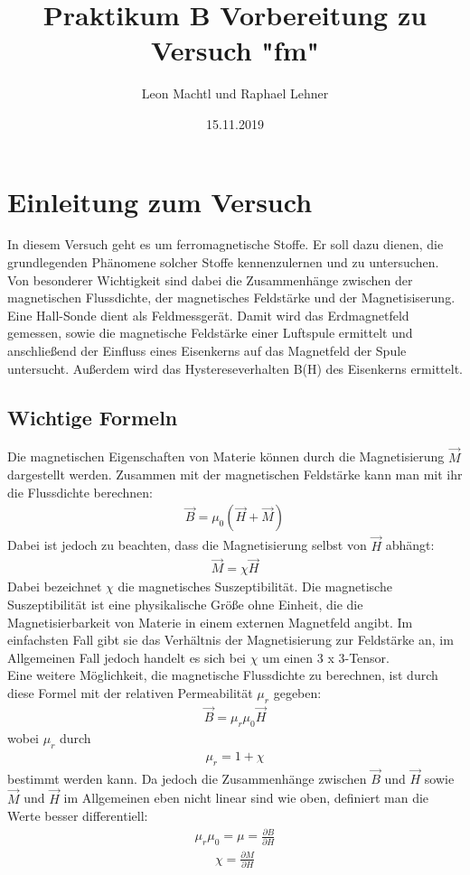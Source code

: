 \documentclass[a4paper,10pt]{scrartcl}
\title{Praktikum B Vorbereitung zu Versuch "fm"}
\author{Leon Machtl und Raphael Lehner}
\date{15.11.2019}
\begin{document}
	\maketitle
	\tableofcontents
	\newpage
	
	\section{Einleitung zum Versuch}
		In diesem Versuch geht es um ferromagnetische Stoffe. Er soll dazu dienen, die grundlegenden Phänomene solcher Stoffe kennenzulernen und zu untersuchen. Von besonderer Wichtigkeit sind dabei die Zusammenhänge zwischen der magnetischen Flussdichte, der magnetisches Feldstärke und der Magnetisiserung. Eine Hall-Sonde dient als Feldmessgerät. Damit wird das Erdmagnetfeld gemessen, sowie die magnetische Feldstärke einer Luftspule ermittelt und anschließend der Einfluss eines Eisenkerns auf das Magnetfeld der Spule untersucht. Außerdem wird das Hystereseverhalten B(H) des Eisenkerns ermittelt.
	
	\subsection{Wichtige Formeln}
		Die magnetischen Eigenschaften von Materie können durch die Magnetisierung \(\vec{M}\) dargestellt werden. Zusammen mit der magnetischen Feldstärke kann man mit ihr die Flussdichte berechnen:
		\begin{align}
		\vec{B}=\mu_{0} (\vec{H} + \vec{M})
		\end{align}
		Dabei ist jedoch zu beachten, dass die Magnetisierung selbst von \(\vec{H}\) abhängt:
		\begin{align}
		\vec{M}=\chi \vec{H} 
		\end{align}
		Dabei bezeichnet \(\chi\) die magnetisches Suszeptibilität. Die magnetische Suszeptibilität ist eine physikalische Größe ohne Einheit, die die Magnetisierbarkeit von Materie in einem externen Magnetfeld angibt. Im einfachsten Fall gibt sie das Verhältnis der Magnetisierung zur Feldstärke an, im Allgemeinen Fall jedoch handelt es sich bei \(\chi\) um einen 3 x 3-Tensor.\\
		Eine weitere Möglichkeit, die magnetische Flussdichte zu berechnen, ist durch diese Formel mit der relativen Permeabilität \(\mu_{r}\) gegeben:
		\begin{align}
		\vec{B}=\mu_{r} \mu_{0} \vec{H} 
		\end{align}
		wobei \(\mu_{r}\) durch
		\begin{align}
		\mu_{r}=1+\chi 
		\end{align} 
		bestimmt werden kann. Da jedoch die Zusammenhänge zwischen \(\vec{B}\) und \(\vec{H}\) sowie \(\vec{M}\) und \(\vec{H}\) im Allgemeinen eben nicht linear sind wie oben, definiert man die Werte besser differentiell:
		\begin{align}
		\mu_{r} \mu_{0}=\mu =\frac{\partial B}{\partial H}
		\end{align}
		\begin{align}
		\chi=\frac{\partial M}{\partial H}
		\end{align}
		\newpage
		
\end{document}
